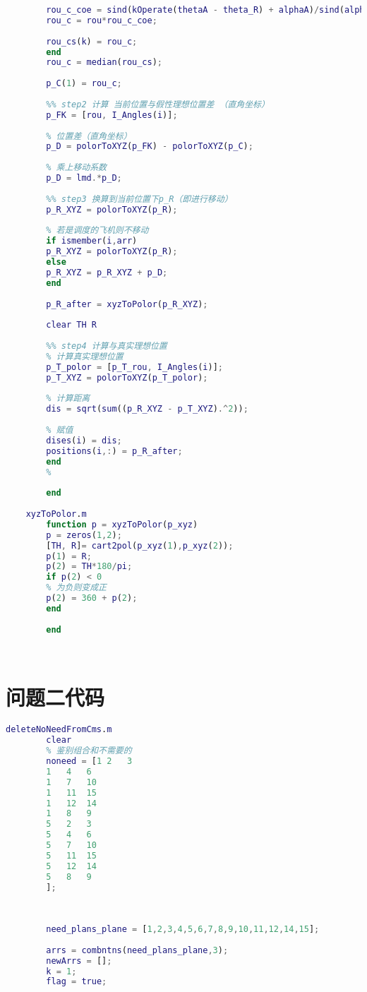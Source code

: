 \documentclass{cumcmthesis}
\begin{document}
\begin{appendices}
\begin{lstlisting}[language=matlab]
		% 求解rou'
		rou_c_coe = sind(kOperate(thetaA - theta_R) + alphaA)/sind(alphaA);
		rou_c = rou*rou_c_coe;
		
		rou_cs(k) = rou_c;
		end
		rou_c = median(rou_cs);
		
		p_C(1) = rou_c;
		
		%% step2 计算 当前位置与假性理想位置差 （直角坐标）
		p_FK = [rou, I_Angles(i)];
		
		% 位置差（直角坐标）
		p_D = polorToXYZ(p_FK) - polorToXYZ(p_C);
		
		% 乘上移动系数
		p_D = lmd.*p_D;
		
		%% step3 换算到当前位置下p_R（即进行移动）
		p_R_XYZ = polorToXYZ(p_R);
		
		% 若是调度的飞机则不移动
		if ismember(i,arr)
		p_R_XYZ = polorToXYZ(p_R);
		else
		p_R_XYZ = p_R_XYZ + p_D;
		end
		
		p_R_after = xyzToPolor(p_R_XYZ);
		
		clear TH R
		
		%% step4 计算与真实理想位置
		% 计算真实理想位置
		p_T_polor = [p_T_rou, I_Angles(i)];
		p_T_XYZ = polorToXYZ(p_T_polor);
		
		% 计算距离
		dis = sqrt(sum((p_R_XYZ - p_T_XYZ).^2));
		
		% 赋值
		dises(i) = dis;
		positions(i,:) = p_R_after;
		end
		%
		
		end
		
	xyzToPolor.m
		function p = xyzToPolor(p_xyz)
		p = zeros(1,2);
		[TH, R]= cart2pol(p_xyz(1),p_xyz(2));
		p(1) = R;
		p(2) = TH*180/pi;
		if p(2) < 0
		% 为负则变成正
		p(2) = 360 + p(2);
		end
		
		end
		
		
	\end{lstlisting}
	
	\section{问题二代码}
	
	\begin{lstlisting}[language=matlab]
	deleteNoNeedFromCms.m	
		clear
		% 鉴别组合和不需要的
		noneed = [1	2	3
		1	4	6
		1	7	10
		1	11	15
		1	12	14
		1	8	9
		5	2	3
		5	4	6
		5	7	10
		5	11	15
		5	12	14
		5	8	9
		];
		
		
		
		need_plans_plane = [1,2,3,4,5,6,7,8,9,10,11,12,14,15];
		
		arrs = combntns(need_plans_plane,3);
		newArrs = [];
		k = 1;
		flag = true;
		

\end{lstlisting}
\end{appendices}
\end{document}
